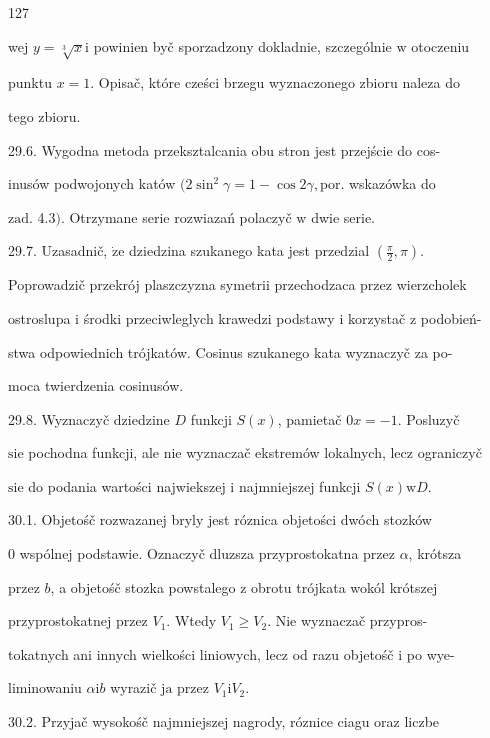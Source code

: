 \documentclass[a4paper,12pt]{article}
\begin{document}
127

wej $y=\sqrt[3]{x}\mathrm{i}$ powinien byč sporzadzony dokladnie, szczególnie $\mathrm{w}$ otoczeniu

punktu $x=1$. Opisač, które cześci brzegu wyznaczonego zbioru naleza do

tego zbioru.

29.6. Wygodna metoda przeksztalcania obu stron jest przejście do cos-

inusów podwojonych katów $(2\sin^{2}\gamma = 1-\cos 2\gamma, \mathrm{p}\mathrm{o}\mathrm{r}$. wskazówka do

$\mathrm{z}\mathrm{a}\mathrm{d}$. 4.3$)$. Otrzymane serie rozwiazań polaczyč $\mathrm{w}$ dwie serie.

29.7. Uzasadnič, $\dot{\mathrm{z}}\mathrm{e}$ dziedzina szukanego kata jest przedzial $(\displaystyle \frac{\pi}{2},\pi).$

Poprowadzič przekrój plaszczyzna symetrii przechodzaca przez wierzcholek

ostroslupa $\mathrm{i}$ środki przeciwleglych krawedzi podstawy $\mathrm{i}$ korzystač $\mathrm{z}$ podobień-

stwa odpowiednich trójkatów. Cosinus szukanego kata wyznaczyč za po-

moca twierdzenia cosinusów.

29.8. Wyznaczyč dziedzine $D$ funkcji $S(x)$, pamietač $0x=-1$. Posluzyč

$\mathrm{s}\mathrm{i}\mathrm{e}$ pochodna funkcji, ale nie wyznaczač ekstremów lokalnych, lecz ograniczyč

$\mathrm{s}\mathrm{i}\mathrm{e}$ do podania wartości najwiekszej $\mathrm{i}$ najmniejszej funkcji $S(x)\mathrm{w}D.$

30.1. Objetośč rozwazanej bryly jest róznica objetości dwóch stozków

$0$ wspólnej podstawie. Oznaczyč dluzsza przyprostokatna przez $\alpha$, krótsza

przez $b$, a objetośč stozka powstalego $\mathrm{z}$ obrotu trójkata wokól krótszej

przyprostokatnej przez $V_{1}$. Wtedy $V_{1} \geq V_{2}$. Nie wyznaczač przypros-

tokatnych ani innych wielkości liniowych, lecz od razu objetośč $\mathrm{i}$ po wye-

liminowaniu $\alpha \mathrm{i}b$ wyrazič $\mathrm{j}\mathrm{a}$ przez $V_{1}\mathrm{i}V_{2}.$

30.2. Przyjač wysokośč najmniejszej nagrody, róznice ciagu oraz liczbe
\end{document}
